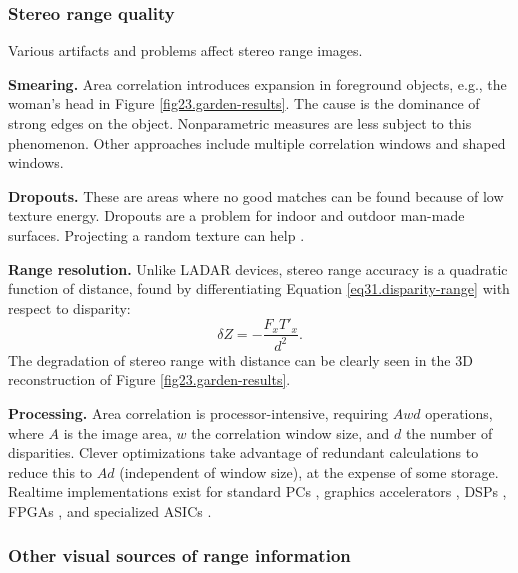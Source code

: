 \documentclass[twocolumn,oneside]{book}
\begin{document}
\subsubsection{Stereo range quality}

Various artifacts and problems affect stereo range images.

{\bf Smearing.}  Area correlation introduces expansion in foreground
objects, e.g., the woman's head in Figure \ref{fig23.garden-results}.
The cause is the dominance of strong edges on the object.
Nonparametric measures are less subject to this phenomenon.  Other
approaches include multiple correlation windows and shaped windows.

{\bf Dropouts.}  These are areas where no good matches can be found
because of low texture energy.  Dropouts are a problem for indoor and
outdoor man-made surfaces.  Projecting a random texture can help
\cite{adan}.

{\bf Range resolution.}  Unlike LADAR devices, stereo range accuracy
is a quadratic function of distance, found by differentiating Equation
\ref{eq31.disparity-range} with respect to disparity:
\begin{equation}
 \delta Z = -\frac{F_x T'_x}{d^2}.
\end{equation}
The degradation of stereo range with distance can be clearly seen in
the 3D reconstruction of Figure \ref{fig23.garden-results}.

{\bf Processing.}  Area correlation is processor-intensive, requiring
$Awd$ operations, where $A$ is the image area, $w$ the correlation
window size, and $d$ the number of disparities.  Clever optimizations
take advantage of redundant calculations to reduce this to $Ad$
(independent of window size), at the expense of some storage.
Realtime implementations exist for standard PCs \cite{videre,ptgrey},
graphics accelerators \cite{zach03accurate,yang03multiresolution},
DSPs \cite{konolige97}, FPGAs \cite{videre,focusrobotics}, and
specialized ASICs \cite{tyzx}.

\subsubsection{Other visual sources of range information}
\end{document}
